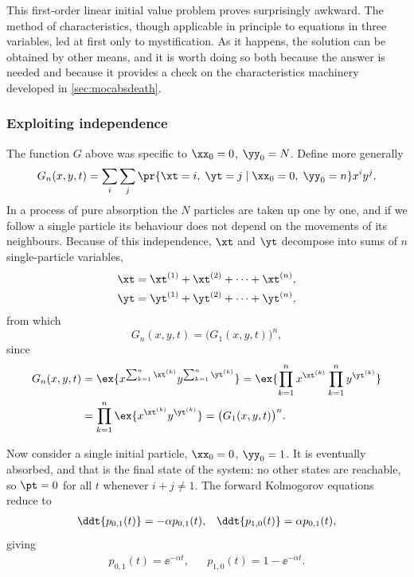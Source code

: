 This first-order linear initial value problem proves surprisingly awkward. The
method of characteristics, though applicable in principle to equations in three
variables, led at first only to mystification. As it happens, the solution can be
obtained by other means, and it is worth doing so both because the answer is needed
and because it provides a check on the characteristics machinery developed in
\cref{sec:mocabsdeath}.

\subsubsection*{Exploiting independence}

The function $G$ above was specific to $\xx_0=0$, $\yy_0=N$. Define more generally
\begin{equation*}
G_n(x,y,t) = \sum_i\sum_j \pr{\xt = i,\;\yt=j \;|\;\xx_0 = 0,\;\yy_0=n } x^i y^j .
\end{equation*}
In a process of pure absorption the $N$ particles are taken up one by one, and if we
follow a single particle its behaviour does not depend on the movements of its
neighbours. Because of this independence, $\xt$ and $\yt$ decompose into sums of
$n$ single-particle variables,
\begin{align*}
\xt &= \xt^{(1)} + \xt^{(2)} + \dots + \xt^{(n)},\\
\yt &= \yt^{(1)} + \yt^{(2)} + \dots + \yt^{(n)},
\end{align*}
from which
\begin{equation}
\label{indRelPGF}
G_n(x,y,t) = \bigl(G_1(x,y,t)\bigr)^n ,
\end{equation}
since
\begin{align*}
G_n(x,y,t) &= \ex{x^{\sum_{k=1}^n \xt^{(k)}} y^{\sum_{k=1}^n \yt^{(k)}}}
= \ex{\prod_{k=1}^n x^{\xt^{(k)}} \prod_{k=1}^n y^{\yt^{(k)}}}\\
&= \prod_{k=1}^n\ex{x^{\xt^{(k)}} y^{\yt^{(k)}}}
= \bigl(G_1(x,y,t)\bigr)^n .
\end{align*}

Now consider a single initial particle, $\xx_0=0$, $\yy_0=1$. It is eventually
absorbed, and that is the final state of the system: no other states are reachable,
so $\pt=0$ for all $t$ whenever $i+j\neq1$. The forward Kolmogorov equations reduce
to
\begin{align*}
\ddt{p_{0,1}(t)} = -\alpha p_{0,1}(t), && \ddt{p_{1,0}(t)} = \alpha p_{0,1}(t),
\end{align*}
giving
\begin{align*}
p_{0,1}(t) = \ee^{-\alpha t}, && p_{1,0}(t) = 1 - \ee^{-\alpha t} .
\end{align*}

